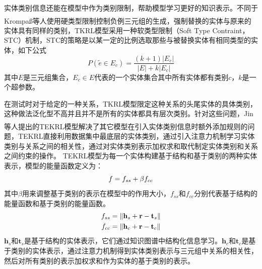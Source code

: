 \documentclass[twocolumn]{article}
\newcommand{\upcite}[1]{\textsuperscript{\textsuperscript{\cite{#1}}}}
\begin{document}
	\noindent 实体类别信息还能在模型中作为类别限制，帮助模型学习更好的知识表示。不同于Krompaß等人\upcite{typeconstrain}使用硬类型限制控制负例三元组的生成，强制替换的实体与原来的实体具有同样的类别，TKRL模型采用一种软类型限制（Soft Type Contraint，STC）机制，STC的策略是以某一定的比例选取那些与被替换实体有相同类型的实体，如下公式
	\begin{equation}
		P(\widetilde{e}\in E_c)=\frac{(k+1)\left | E_c \right |}{\left | E \right |+k\left | E_c \right |}
	\end{equation}
	其中$E$是三元组集合，$E_c\in E$代表的一个实体集合其中所有实体都有类别$c$，$k$是一个超参数。
	
	在测试时对于给定的一种关系，TKRL模型限定这种关系的头尾实体的具体类别，这种做法泛化型不高并且并不是所有的实体都具有层次类别。针对这些问题，Jin等人\upcite{TEKRL}提出的TEKRL模型解决了其它模型在引入实体类别信息时额外添加规则的问题，TEKRL直接利用数据集中最底层的实体类别，通过引入注意力机制学习实体类别与关系之间的相关性，通过对实体类别表示加权求和取代制定实体类别和关系之间约束的操作。
	TEKRL模型为每一个实体构建基于结构和基于类别的两种实体表示，模型的能量函数定义为：
	\begin{equation}
		f=f_{ss}+\beta f_{cc} \notag
	\end{equation}
	其中$\beta$用来调整基于类别的表示在模型中的作用大小，$f_{ss}$和$f_{cc}$分别代表基于结构的能量函数和基于类别的能量函数。
	\begin{gather}
		f_{ss}=\left \| \textbf{h}_s+\textbf{r}-\textbf{t}_s \right \| \notag \\
		f_{cc}=\left \| \textbf{h}_c+\textbf{r}-\textbf{t}_c \right \| \notag 
	\end{gather}
	$\textbf{h}_s$和$\textbf{t}_s$是基于结构的实体表示，它们通过知识图谱中结构化信息学习。$\textbf{h}_c$和$\textbf{t}_c$是基于类别的实体表示，通过注意力机制得到实体类别表示与三元组中关系的相关性，然后对所有类别的表示加权求和作为实体的基于类别的表示。
	
\end{document}
